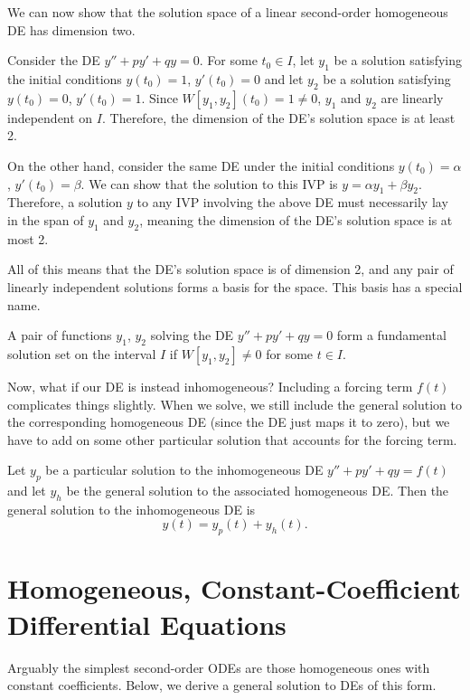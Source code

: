 \documentclass[../m82main.tex]{subfiles}
\begin{document}
We can now show that the solution space of a linear second-order homogeneous DE has dimension two.

Consider the DE $y'' + py' + qy = 0$.
For some $t_0 \in I$, let $y_1$ be a solution satisfying the initial conditions $y(t_0) = 1$, $y'(t_0) = 0$ and let $y_2$ be a solution satisfying $y(t_0) = 0$, $y'(t_0) = 1$.
Since $W[y_1, y_2](t_0) = 1 \neq 0$, $y_1$ and $y_2$ are linearly independent on $I$.
Therefore, the dimension of the DE's solution space is at least 2.

On the other hand, consider the same DE under the initial conditions $y(t_0) = \alpha$, $y'(t_0) = \beta$.
We can show that the solution to this IVP is $y = \alpha y_1 + \beta y_2$.
Therefore, a solution $y$ to any IVP involving the above DE must necessarily lay in the span of $y_1$ and $y_2$, meaning the dimension of the DE's solution space is at most 2.

All of this means that the DE's solution space is of dimension 2, and any pair of linearly independent solutions forms a basis for the space.
This basis has a special name.

\begin{definition}
    A pair of functions $y_1$, $y_2$ solving the DE $y'' + py' + qy = 0$ form a fundamental solution set on the interval $I$ if $W[y_1, y_2] \neq 0$ for some $t \in I$.
\end{definition}

Now, what if our DE is instead inhomogeneous?
Including a forcing term $f(t)$ complicates things slightly.
When we solve, we still include the general solution to the corresponding homogeneous DE (since the DE just maps it to zero), but we have to add on some other particular solution that accounts for the forcing term.

\begin{theorem}
    Let $y_p$ be a particular solution to the inhomogeneous DE $y'' + py' + qy = f(t)$ and let $y_h$ be the general solution to the associated homogeneous DE.
    Then the general solution to the inhomogeneous DE is
    \[ y(t) = y_p(t) + y_h(t). \]
\end{theorem}

\section{Homogeneous, Constant-Coefficient Differential Equations}
Arguably the simplest second-order ODEs are those homogeneous ones with constant coefficients.
Below, we derive a general solution to DEs of this form.
\end{document}
